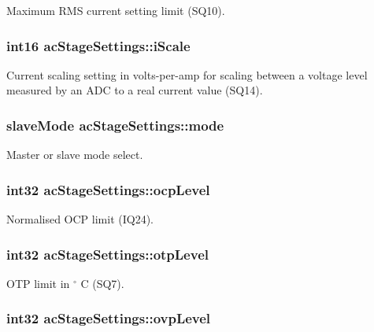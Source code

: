 Maximum R\-M\-S current setting limit (S\-Q10). \hypertarget{a00004_ade324e2ab9ea9a6d3620cf7028cc4c1d}{
\subsubsection[{i\-Scale}]{\setlength{\rightskip}{0pt plus 5cm}int16 ac\-Stage\-Settings\-::i\-Scale}}\label{a00004_ade324e2ab9ea9a6d3620cf7028cc4c1d}
Current scaling setting in volts-\/per-\/amp for scaling between a voltage level measured by an A\-D\-C to a real current value (S\-Q14). \hypertarget{a00004_a3cb6e49a13279ff6c21dfdb9ee7f2f83}{
\subsubsection[{mode}]{\setlength{\rightskip}{0pt plus 5cm}slave\-Mode ac\-Stage\-Settings\-::mode}}\label{a00004_a3cb6e49a13279ff6c21dfdb9ee7f2f83}
Master or slave mode select. \hypertarget{a00004_a96fd85bb29c3f2ce0515eedbc353cd9f}{
\subsubsection[{ocp\-Level}]{\setlength{\rightskip}{0pt plus 5cm}int32 ac\-Stage\-Settings\-::ocp\-Level}}\label{a00004_a96fd85bb29c3f2ce0515eedbc353cd9f}
Normalised O\-C\-P limit (I\-Q24). \hypertarget{a00004_a650064b66038e3805f5bd42459d01bb4}{
\subsubsection[{otp\-Level}]{\setlength{\rightskip}{0pt plus 5cm}int32 ac\-Stage\-Settings\-::otp\-Level}}\label{a00004_a650064b66038e3805f5bd42459d01bb4}
O\-T\-P limit in $ ^\circ$ C (S\-Q7). \hypertarget{a00004_a8b5f24f22b2b5c641cb4b81d27a13ff7}{
\subsubsection[{ovp\-Level}]{\setlength{\rightskip}{0pt plus 5cm}int32 ac\-Stage\-Settings\-::ovp\-Level}}\label{a00004_a8b5f24f22b2b5c641cb4b81d27a13ff7}
